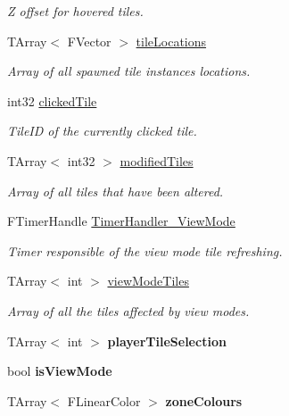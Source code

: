 \begin{DoxyCompactItemize}
\begin{DoxyCompactList}\small\item\em Z offset for hovered tiles. \end{DoxyCompactList}\item 
T\+Array$<$ F\+Vector $>$ \mbox{\hyperlink{class_a_t_t___grid_manager_a31d6d9555ca13c2a396c1d6c9960c324}{tile\+Locations}}
\begin{DoxyCompactList}\small\item\em Array of all spawned tile instances locations. \end{DoxyCompactList}\item 
int32 \mbox{\hyperlink{class_a_t_t___grid_manager_a280e5772f55941219c918dcfe1c9dd5d}{clicked\+Tile}}
\begin{DoxyCompactList}\small\item\em Tile\+ID of the currently clicked tile. \end{DoxyCompactList}\item 
T\+Array$<$ int32 $>$ \mbox{\hyperlink{class_a_t_t___grid_manager_a74b524fdfe1491c3f7184fae52b2e37d}{modified\+Tiles}}
\begin{DoxyCompactList}\small\item\em Array of all tiles that have been altered. \end{DoxyCompactList}\item 
F\+Timer\+Handle \mbox{\hyperlink{class_a_t_t___grid_manager_ad1283266d72303c6d790bbec2f0277d1}{Timer\+Handler\+\_\+\+View\+Mode}}
\begin{DoxyCompactList}\small\item\em Timer responsible of the view mode tile refreshing. \end{DoxyCompactList}\item 
T\+Array$<$ int $>$ \mbox{\hyperlink{class_a_t_t___grid_manager_af541d9efe0df837396a4ffafcebd6205}{view\+Mode\+Tiles}}
\begin{DoxyCompactList}\small\item\em Array of all the tiles affected by view modes. \end{DoxyCompactList}\item 
\mbox{\label{class_a_t_t___grid_manager_afdf71501f6323d85119e648e4c2ea78b}} 
T\+Array$<$ int $>$ {\bfseries player\+Tile\+Selection}
\item 
\mbox{\label{class_a_t_t___grid_manager_a8ea034d7d15b41e20a4a0fc3839cfc79}} 
bool {\bfseries is\+View\+Mode}
\item 
\mbox{\label{class_a_t_t___grid_manager_a891d98b1959ef1ac4b56e750a87501b8}} 
T\+Array$<$ F\+Linear\+Color $>$ {\bfseries zone\+Colours}
\end{DoxyCompactItemize}



